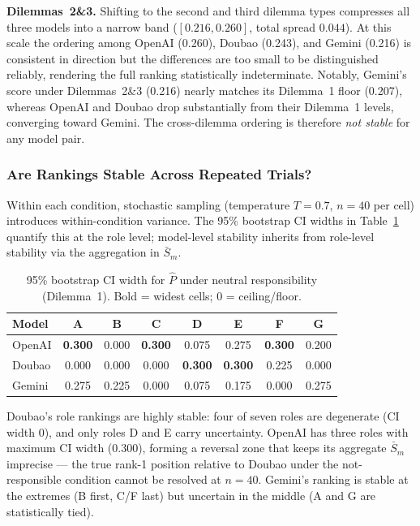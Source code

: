\textbf{Dilemmas~2\&3.}
Shifting to the second and third dilemma types compresses all three models into a narrow
band ($[0.216, 0.260]$, total spread $0.044$).  At this scale the ordering among OpenAI
(0.260), Doubao (0.243), and Gemini (0.216) is consistent in direction but the differences
are too small to be distinguished reliably, rendering the full ranking statistically
indeterminate.  Notably, Gemini's score under Dilemmas~2\&3 (0.216) nearly matches its
Dilemma~1 floor (0.207), whereas OpenAI and Doubao drop substantially from their
Dilemma~1 levels, converging toward Gemini.  The cross-dilemma ordering is therefore
\emph{not stable} for any model pair.

\subsubsection{Are Rankings Stable Across Repeated Trials?}

Within each condition, stochastic sampling (temperature $T = 0.7$, $n = 40$ per cell)
introduces within-condition variance.  The 95\% bootstrap CI widths in
Table~\ref{tab:rank_stability} quantify this at the role level; model-level stability
inherits from role-level stability via the aggregation in $\bar{S}_m$.

\begin{table}[htbp]
\centering
\caption{95\% bootstrap CI width for $\hat{P}$ under neutral responsibility (Dilemma~1).
  Bold = widest cells; 0 = ceiling/floor.}
\label{tab:rank_stability}
\setlength{\tabcolsep}{5pt}
\begin{tabular}{lccccccc}
\hline
\textbf{Model} & A & B & C & D & E & F & G \\
\hline
OpenAI & \textbf{0.300} & 0.000 & \textbf{0.300} & 0.075 & 0.275 & \textbf{0.300} & 0.200 \\
Doubao & 0.000 & 0.000 & 0.000 & \textbf{0.300} & \textbf{0.300} & 0.225 & 0.000 \\
Gemini & 0.275 & 0.225 & 0.000 & 0.075 & 0.175 & 0.000 & 0.275 \\
\hline
\end{tabular}
\end{table}

Doubao's role rankings are highly stable: four of seven roles are degenerate (CI width 0),
and only roles D and E carry uncertainty.  OpenAI has three roles with maximum CI width
(0.300), forming a reversal zone that keeps its aggregate $\bar{S}_m$ imprecise --- the
true rank-1 position relative to Doubao under the not-responsible condition cannot be
resolved at $n = 40$.  Gemini's ranking is stable at the extremes (B first, C/F last) but
uncertain in the middle (A and G are statistically tied).
